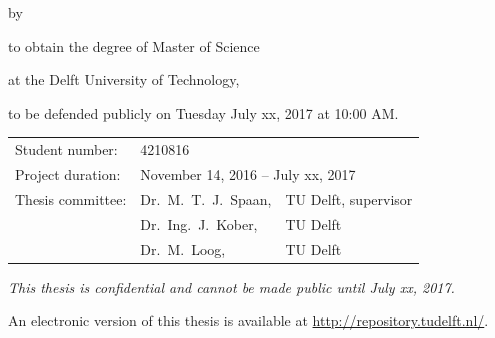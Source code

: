 \begin{titlepage}


\begin{center}


{\makeatletter
\largetitlestyle\fontsize{28}{94}\selectfont\@title										%
\makeatother}

{\makeatletter
\ifx\@subtitle\undefined\else
    \bigskip
   {\tudsffamily\fontsize{22}{32}\selectfont\@subtitle}    
\fi
\makeatother}

\bigskip
\bigskip

by

\bigskip
\bigskip

{\makeatletter
\largetitlestyle\fontsize{20}{26}\selectfont\@author
\makeatother}

\bigskip
\bigskip

to obtain the degree of Master of Science

at the Delft University of Technology,

to be defended publicly on Tuesday July xx, 2017 at 10:00 AM.

\vfill

\begin{tabular}{lll}
    Student number: & 4210816 \\
    Project duration: & \multicolumn{2}{l}{November 14, 2016 -- July xx, 2017} \\
    Thesis committee: & Dr.\ M.\ T.\ J.\ Spaan, & TU Delft, supervisor \\
        & Dr.\ Ing.\ J.\ Kober, & TU Delft \\												%
        & Dr.\ M.\ Loog, & TU Delft 											%
\end{tabular}

\bigskip
\bigskip
\emph{This thesis is confidential and cannot be made public until July xx, 2017.}

\bigskip
\bigskip
An electronic version of this thesis is available at \url{http://repository.tudelft.nl/}.


\end{center}
\end{titlepage}
